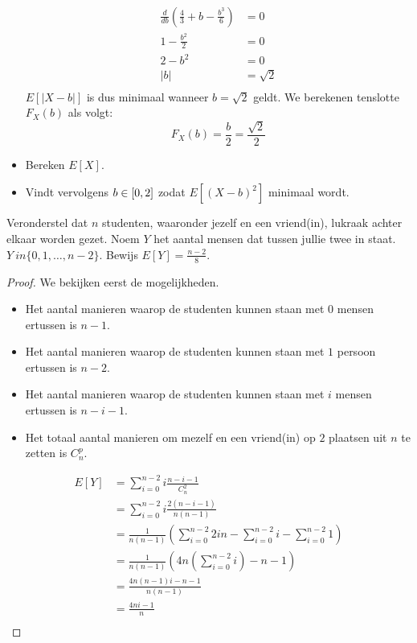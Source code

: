 \documentclass[main.tex]{subfiles}
\begin{document}
\begin{oef}
\begin{itemize}
\[\begin{array}{rl}
    \end{array}
    \]
    \[
    \begin{array}{cc}
      \frac{d}{db}\left(\frac{4}{3} + b - \frac{b^{3}}{6}\right) &= 0\\
      1 - \frac{b^{2}}{2} &= 0\\
      2 - b^{2} &= 0\\
      |b| &= \sqrt{2}\\
    \end{array}
    \]
    $E[|X-b|]$ is dus minimaal wanneer $b=\sqrt{2}$ geldt.
    We berekenen tenslotte $F_{X}(b)$ als volgt:
    \[ F_{X}(b) = \frac{b}{2} =\frac{\sqrt{2}}{2} \]
  \item Bereken $E[X]$.
  \item Vindt vervolgens $b \in \interval{0}{2}$ zodat $E[(X-b)^{2}]$ minimaal wordt.
  \end{itemize}
\end{oef}

\begin{oef}
  Veronderstel dat $n$ studenten, waaronder jezelf en een vriend(in), lukraak achter elkaar worden gezet.
  Noem $Y$ het aantal mensen dat tussen jullie twee in staat. $Y \
in \{ 0,1,\dotsc,n-2 \}$.
  Bewijs $E[Y] =\frac{n-2}{8}$.

  \begin{proof}
    We bekijken eerst de mogelijkheden.
    \begin{itemize}
    \item Het aantal manieren waarop de studenten kunnen staan met $0$ mensen ertussen is $n-1$.
    \item Het aantal manieren waarop de studenten kunnen staan met $1$ persoon ertussen is $n-2$.
    \item Het aantal manieren waarop de studenten kunnen staan met $i$ mensen ertussen is $n-i-1$.
    \item Het totaal aantal manieren om mezelf en een vriend(in) op $2$ plaatsen uit $n$ te zetten is $C_{n}^{p}$.
    \end{itemize}
    \[
    \begin{array}{rl}
      E[Y]
      &= \sum_{i=0}^{n-2}i \frac{n-i-1}{C_{n}^{2}}\\
      &= \sum_{i=0}^{n-2}i\frac{2(n-i-1)}{n(n-1)}\\
      &= \frac{1}{n(n-1)}\left(\sum_{i=0}^{n-2}2in-\sum_{i=0}^{n-2}i-\sum_{i=0}^{n-2}1\right)\\
      &= \frac{1}{n(n-1)}\left(4n\left(\sum_{i=0}^{n-2}i\right)-n-1\right)\\
      &= \frac{4n(n-1)i-n-1}{n(n-1)}\\
      &= \frac{4ni-1}{n}\\
    \end{array}
    \]
  \end{proof}
\end{oef}
\end{document}
